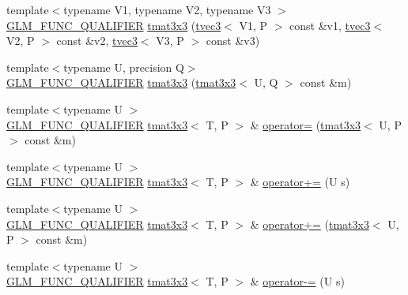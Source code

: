 \begin{DoxyCompactItemize}
\item 
{\footnotesize template$<$typename V1, typename V2, typename V3 $>$ }\\\hyperlink{setup_8hpp_a33fdea6f91c5f834105f7415e2a64407}{G\+L\+M\+\_\+\+F\+U\+N\+C\+\_\+\+Q\+U\+A\+L\+I\+F\+I\+ER} \hyperlink{structglm_1_1detail_1_1tmat3x3_a4093d2793f9a8895d7632b8163849670}{tmat3x3} (\hyperlink{structglm_1_1detail_1_1tvec3}{tvec3}$<$ V1, P $>$ const \&v1, \hyperlink{structglm_1_1detail_1_1tvec3}{tvec3}$<$ V2, P $>$ const \&v2, \hyperlink{structglm_1_1detail_1_1tvec3}{tvec3}$<$ V3, P $>$ const \&v3)
\item 
{\footnotesize template$<$typename U, precision Q$>$ }\\\hyperlink{setup_8hpp_a33fdea6f91c5f834105f7415e2a64407}{G\+L\+M\+\_\+\+F\+U\+N\+C\+\_\+\+Q\+U\+A\+L\+I\+F\+I\+ER} \hyperlink{structglm_1_1detail_1_1tmat3x3_a5a59337ed9a816f87aa1c16300c670f8}{tmat3x3} (\hyperlink{structglm_1_1detail_1_1tmat3x3}{tmat3x3}$<$ U, Q $>$ const \&m)
\item 
{\footnotesize template$<$typename U $>$ }\\\hyperlink{setup_8hpp_a33fdea6f91c5f834105f7415e2a64407}{G\+L\+M\+\_\+\+F\+U\+N\+C\+\_\+\+Q\+U\+A\+L\+I\+F\+I\+ER} \hyperlink{structglm_1_1detail_1_1tmat3x3}{tmat3x3}$<$ T, P $>$ \& \hyperlink{structglm_1_1detail_1_1tmat3x3_a460c6e70ac10a60f30d800146e65f1ba}{operator=} (\hyperlink{structglm_1_1detail_1_1tmat3x3}{tmat3x3}$<$ U, P $>$ const \&m)
\item 
{\footnotesize template$<$typename U $>$ }\\\hyperlink{setup_8hpp_a33fdea6f91c5f834105f7415e2a64407}{G\+L\+M\+\_\+\+F\+U\+N\+C\+\_\+\+Q\+U\+A\+L\+I\+F\+I\+ER} \hyperlink{structglm_1_1detail_1_1tmat3x3}{tmat3x3}$<$ T, P $>$ \& \hyperlink{structglm_1_1detail_1_1tmat3x3_a5e6d2e421fbd009d27051c5bc8a6c487}{operator+=} (U s)
\item 
{\footnotesize template$<$typename U $>$ }\\\hyperlink{setup_8hpp_a33fdea6f91c5f834105f7415e2a64407}{G\+L\+M\+\_\+\+F\+U\+N\+C\+\_\+\+Q\+U\+A\+L\+I\+F\+I\+ER} \hyperlink{structglm_1_1detail_1_1tmat3x3}{tmat3x3}$<$ T, P $>$ \& \hyperlink{structglm_1_1detail_1_1tmat3x3_ac54fab49afb79333e8471a7986fe97b0}{operator+=} (\hyperlink{structglm_1_1detail_1_1tmat3x3}{tmat3x3}$<$ U, P $>$ const \&m)
\item 
{\footnotesize template$<$typename U $>$ }\\\hyperlink{setup_8hpp_a33fdea6f91c5f834105f7415e2a64407}{G\+L\+M\+\_\+\+F\+U\+N\+C\+\_\+\+Q\+U\+A\+L\+I\+F\+I\+ER} \hyperlink{structglm_1_1detail_1_1tmat3x3}{tmat3x3}$<$ T, P $>$ \& \hyperlink{structglm_1_1detail_1_1tmat3x3_a8571cd3a69ca0d1f25d17a724e730c07}{operator-\/=} (U s)

\end{DoxyCompactItemize}
